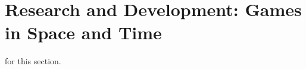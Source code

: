 \chapter[Research and Development: Games in Space and Time]{Research and Development: Games in Space and Time}
\label{ch:rd}


 for this section. \lipsum[4]

\lipsum[4]

\clearpage

\clearpage

\clearpage

\clearpage
